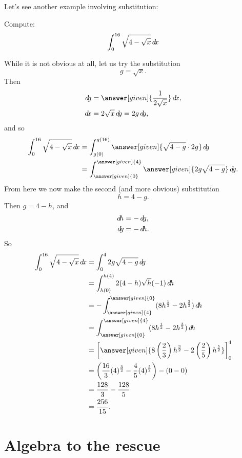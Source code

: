 \documentclass{ximera}
\begin{document}
Let's see another example involving substitution:


\begin{example}
Compute:
\[
\int_0^{16} \sqrt{4 - \sqrt{x}} \mathop{}\!d\! x
\]
\begin{explanation}
While it is not obvious at all, let us try the substitution
\[
g = \sqrt{x}.
\]
Then
\begin{align*}
\d g &= \answer[given]{\frac{1}{2 \sqrt{x}}} \d x,\\
\d x &= 2 \sqrt{x} \d g = 2g \d g,
\end{align*}
and so
\begin{align*}
\int_0^{16} \sqrt{4 - \sqrt{x}} \d x &= \int_{g(0)}^{g(16)} \answer[given]{\sqrt{4-g} \cdot 2g} \d g  \\
&= \int_{\answer[given]{0}}^{\answer[given]{4}} \answer[given]{2g \sqrt{4-g}} \d g.
\end{align*}
From here we now make the second (and more obvious) substitution
\[
h = 4-g.
\]
Then $g = 4-h$, and
\begin{align*}
\d h &= - \d g,\\
\d g &= - \d h.
\end{align*}
So
\begin{align*}
\int_0^{16} \sqrt{4 - \sqrt{x}} \d x &= \int_0^4 2g \sqrt{4-g} \d g  \\
&= \int_{h(0)}^{h(4)} 2 (4-h) \sqrt{h} (-1) \d h  \\
&= - \int_{\answer[given]{4}}^{\answer[given]{0}} ( 8h^{\frac{1}{2}} - 2h^{\frac{3}{2}} ) \d h  \\
&= \int_{\answer[given]{0}}^{\answer[given]{4}} ( 8h^{\frac{1}{2}} - 2h^{\frac{3}{2}} ) \d h  \\
&= \eval{ \answer[given]{8 \left( \frac{2}{3} \right) h^{\frac{3}{2}} - 2 \left( \frac{2}{5} \right) h^{\frac{5}{2}}} }_{0}^{4}  \\
&= \left( \frac{16}{3} (4)^{\frac{3}{2}} - \frac{4}{5} (4)^{\frac{5}{2}} \right) - \left( 0 - 0 \right)  \\
&= \frac{128}{3} - \frac{128}{5}   \\
&= \frac{256}{15}.
\end{align*}
\end{explanation}
\end{example}


\section{Algebra to the rescue}
\end{document}
